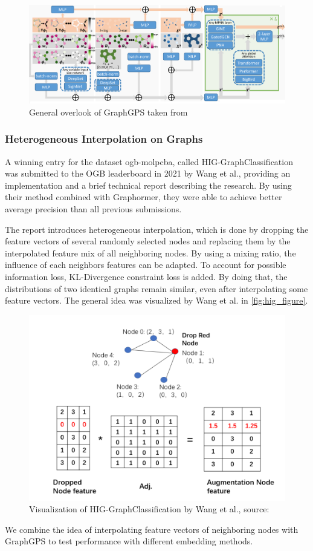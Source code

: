 \begin{figure}[ht!]
    \centering
    \includegraphics[scale=0.13]{tex/res/gps_abstract.png}
    \caption{General overlook of GraphGPS taken from~\cite{2023graphgps}}
    \label{fig:gps-abstract}
\end{figure}

\subsubsection{Heterogeneous Interpolation on Graphs}
A winning entry for the dataset ogb-molpcba, called HIG-GraphClassification~\cite{tencenc2021Hig,tencenc2021HigPaper} was submitted to the OGB leaderboard in 2021 by Wang et al., providing an implementation and a brief technical report describing the research. By using their method combined with Graphormer, they were able to achieve better average precision than all previous submissions.

The report introduces heterogeneous interpolation, which is done by dropping the feature vectors of several randomly selected nodes and replacing them by the interpolated feature mix of all neighboring nodes.
By using a mixing ratio, the influence of each neighbors features can be adapted. To account for possible information loss, KL-Divergence constraint loss is added. By doing that, the distributions of two identical graphs remain similar, even after interpolating some feature vectors. The general idea was visualized by Wang et al. in \autoref{fig:hig_figure}.

\begin{figure}[ht!]
    \centering
    \includegraphics[scale=0.3]{tex/res/hig_figure.png}
    \caption{Visualization of HIG-GraphClassification by Wang et al., \tiny{source: \cite{tencenc2021HigPaper}}}
    \label{fig:hig_figure}
\end{figure}

We combine the idea of interpolating feature vectors of neighboring nodes with GraphGPS to test performance with different embedding methods.